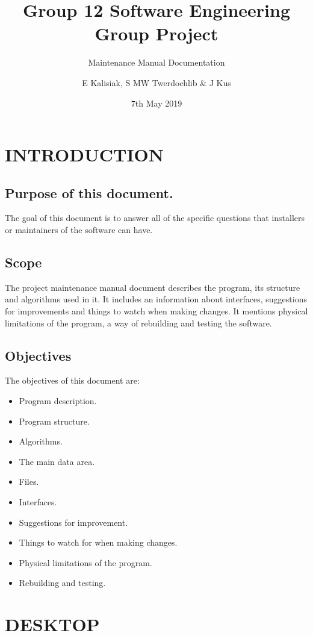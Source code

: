 \documentclass{project}
\begin{document}
\title{Group 12 Software Engineering Group Project}
\subtitle{Maintenance Manual Documentation} 
\author{E Kalisiak, S MW Twerdochlib \& J Kus}     
\date{7th May 2019}
\maketitle
\tableofcontents
\newpage
\section{INTRODUCTION}
\subsection{Purpose of this document.}
The goal of this document is to answer all of the specific questions that installers or maintainers of the software can have.

\subsection{Scope}
The project maintenance manual document describes the program, its structure and algorithms used in it. It includes an information about interfaces, suggestions for improvements and things to watch when making changes. It mentions physical limitations of the program, a way of rebuilding and testing the software.

\subsection{Objectives}
The objectives of this document are: 
\begin{itemize}
\item Program description.
\item Program structure.
\item Algorithms.
\item The main data area.
\item Files.
\item Interfaces.
\item Suggestions for improvement.
\item Things to watch for when making changes.
\item Physical limitations of the program.
\item Rebuilding and testing.
\end{itemize}

\section{DESKTOP}
\end{document}
